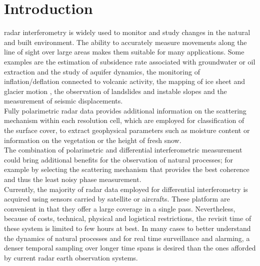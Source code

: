 \section{Introduction}
 radar interferometry\cite{Gabriel1989, Massonnet1993,Rosen2000,Bamler1999} is widely used  to monitor and study changes in the natural and built environment. The ability to accurately measure movements along the line of sight over large areas makes them suitable for many  applications. Some examples are the estimation of subsidence rate associated with groundwater or oil extraction and the study of aquifer dynamics\cite{Hudnut1998,Strozzi2001,Galloway2007a}, the monitoring of inflation/deflation connected to volcanic activity\cite{Massonnet1995}, the mapping of ice sheet and glacier motion\cite{Goldstein1993,Mohr1998} , the observation of landslides and instable slopes\cite{Carnec1996,Catani2005} and the measurement of seismic displacements\cite{Massonnet1993b,Zebker1994}.\\
Fully polarimetric radar data provides additional information on the scattering mechanism within each resolution cell, which are employed for classification of the surface cover\cite{Cloude1997, Lee1999}, to extract geophysical parameters such as moisture content\cite{Hajnsek2003} or information on the vegetation \cite{Ulaby1987} or the height of fresh snow\cite{Leinss2014}.\\
The combination of polarimetric and differential interferometric measurement could bring additional benefits for the observation of natural processes; for example by selecting the scattering mechanism that provides the best coherence and thus the least noisy phase measurement\cite{Pipia2009a, Iglesias2014b}.\\
Currently, the majority of radar data employed for differential interferometry is acquired using sensors carried by satellite or aircrafts. These platform are convenient in that they offer a large coverage in a single pass. Nevertheless, because of costs, technical, physical and logistical restrictions, the revisit time of these system is limited to few hours at best. 
In many cases to better understand the dynamics of natural processes and for real time surveillance and alarming, a denser temporal sampling over longer time spans is desired than the ones afforded by current radar earth observation systems.
